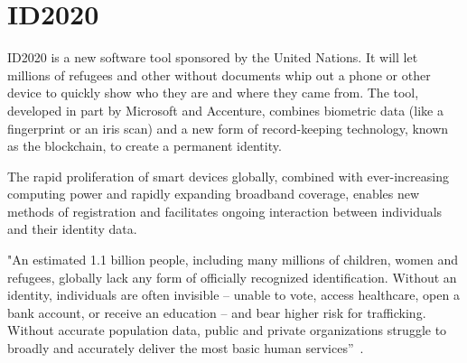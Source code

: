 \section{ID2020}

ID2020 is a new software tool sponsored by the United Nations. It will let millions of refugees and other without documents whip out a phone or other device to quickly show who they are and where they came from. The tool, developed in part by Microsoft and Accenture, combines biometric data (like a fingerprint or an iris scan) and a new form of record-keeping technology, known as the blockchain, to create a permanent identity.
 
The rapid proliferation of smart devices globally, combined with ever-increasing computing power and rapidly expanding broadband coverage, enables new methods of registration and facilitates ongoing interaction between individuals and their identity data. 
 
 "An estimated 1.1 billion people, including many millions of children, women and refugees, globally lack any form of officially recognized identification. Without an identity, individuals are often invisible – unable to vote, access healthcare, open a bank account, or receive an education – and bear higher risk for trafficking. Without accurate population data, public and private organizations struggle to broadly and accurately deliver the most basic human services”~\cite{hid-sp18-506-NoID}.
